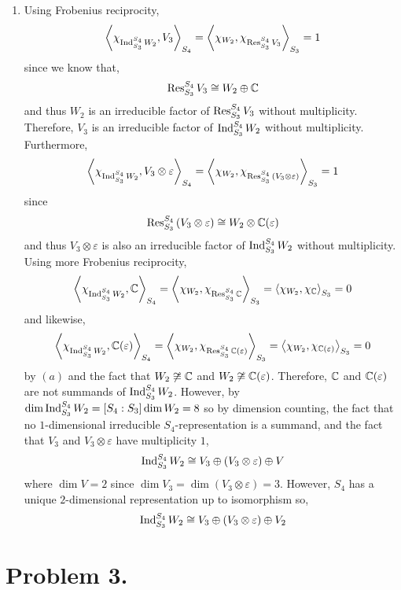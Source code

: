 \documentclass[12pt]{extarticle}
\begin{document}
\begin{enumerate}
\item Using Frobenius reciprocity,
\[ \left< \chi_{\mathrm{Ind}^{S_4}_{S_3} \, W_2}, V_3 \right>_{S_4} = \left< \chi_{{W_2}}, \chi_{\mathrm{Res}^{S_4}_{S_3} \, V_3} \right>_{S_3} = 1\]
since we know that,
\[ \mathrm{Res}^{S_4}_{S_3} \, V_3 \cong W_2 \oplus \mathbb{C} \]
and thus $W_2$ is an irreducible factor of $\mathrm{Res}^{S_4}_{S_3} \, V_3$ without multiplicity. Therefore, $V_3$ is an irreducible factor of $\mathrm{Ind}^{S_4}_{S_3} \, W_2$ without multiplicity. Furthermore,  
\[ \left< \chi_{\mathrm{Ind}^{S_4}_{S_3} \, W_2}, V_3 \otimes \varepsilon \right>_{S_4} = \left< \chi_{{W_2}}, \chi_{\mathrm{Res}^{S_4}_{S_3} \, (V_3 \otimes \varepsilon)} \right>_{S_3} = 1\]
since 
\[ \mathrm{Res}^{S_4}_{S_3} \, (V_3 \otimes \varepsilon) \cong W_2 \otimes \mathbb{C}(\varepsilon) \]
and thus $V_3 \otimes \varepsilon$ is also an irreducible factor of $\mathrm{Ind}^{S_4}_{S_3} \, W_2$ without multiplicity. 
\bigskip\\ 
Using more Frobenius reciprocity,
\[ \left< \chi_{\mathrm{Ind}^{S_4}_{S_3} \, W_2}, \mathbb{C} \right>_{S_4} = \left< \chi_{{W_2}}, \chi_{\mathrm{Res}^{S_4}_{S_3} \, \mathbb{C}} \right>_{S_3} = \left< \chi_{{W_2}}, \chi_{\mathbb{C}} \right>_{S_3} = 0\]
and likewise, 
\[ \left< \chi_{\mathrm{Ind}^{S_4}_{S_3} \, W_2}, \mathbb{C}(\varepsilon) \right>_{S_4} = \left< \chi_{{W_2}}, \chi_{\mathrm{Res}^{S_4}_{S_3} \, \mathbb{C}(\varepsilon)} \right>_{S_3} = \left< \chi_{{W_2}}, \chi_{\mathbb{C}(\varepsilon)} \right>_{S_3} = 0 \]
by $(a)$ and the fact that $W_2 \not\cong \mathbb{C}$ and $W_2 \not\cong \mathbb{C}(\varepsilon)$.
Therefore, $\mathbb{C}$ and $\mathbb{C}(\varepsilon)$ are not summands of $\mathrm{Ind}^{S_4}_{S_3} \, W_2$. However, by $\dim{\mathrm{Ind}^{S_4}_{S_3} \, W_2} = [S_4 : S_3] \dim{W_2} = 8$ so by dimension counting, the fact that no $1$-dimensional irreducible $S_4$-representation is a summand, and the fact that $V_3$ and $V_3 \otimes \varepsilon$ have multiplicity $1$,
\[ \mathrm{Ind}^{S_4}_{S_3} \, W_2 \cong V_3 \oplus (V_3 \otimes \varepsilon) \oplus V\]
where $\dim{V} = 2$ since $\dim{V_3} = \dim{(V_3 \otimes \varepsilon)} = 3$. However, $S_4$ has a unique $2$-dimensional representation up to isomorphism so,
\[ \mathrm{Ind}^{S_4}_{S_3} \, W_2 \cong V_3 \oplus (V_3 \otimes \varepsilon) \oplus V_2\]
\end{enumerate}

\section*{Problem 3.}
\end{document}
